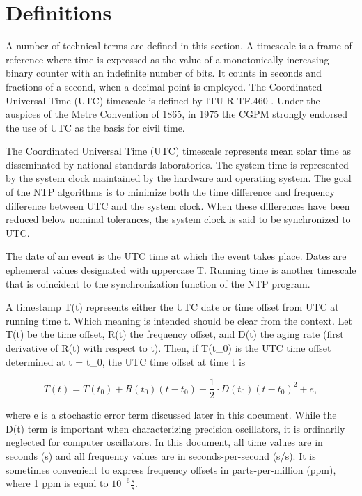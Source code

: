 \chapter{Definitions}

A number of technical terms are defined in this section. A timescale
is a frame of reference where time is expressed as the value of a
monotonically increasing binary counter with an indefinite number of
bits. It counts in seconds and fractions of a second, when a decimal
point is employed. The Coordinated Universal Time (UTC) timescale is
defined by ITU-R TF.460 \cite{ITU-R TF.460}. Under the auspices of the
Metre Convention of 1865, in 1975 the CGPM \cite{CGPM} strongly endorsed
the use of UTC as the basis for civil time.

The Coordinated Universal Time (UTC) timescale represents mean solar
time as disseminated by national standards laboratories. The system
time is represented by the system clock maintained by the hardware
and operating system. The goal of the NTP algorithms is to minimize
both the time difference and frequency difference between UTC and the
system clock. When these differences have been reduced below nominal
tolerances, the system clock is said to be synchronized to UTC.

The date of an event is the UTC time at which the event takes place.
Dates are ephemeral values designated with uppercase T. Running time
is another timescale that is coincident to the synchronization
function of the NTP program.

A timestamp T(t) represents either the UTC date or time offset from
UTC at running time t. Which meaning is intended should be clear
from the context. Let T(t) be the time offset, R(t) the frequency
offset, and D(t) the aging rate (first derivative of R(t) with
respect to t). Then, if T(t\_0) is the UTC time offset determined at
t = t\_0, the UTC time offset at time t is

$$
T(t) = T(t_0) + R(t_0)(t - t_0) + \frac{1}{2} \cdot D(t_0)(t - t_0)^2 + e,
$$

where e is a stochastic error term discussed later in this document.
While the D(t) term is important when characterizing precision
oscillators, it is ordinarily neglected for computer oscillators. In
this document, all time values are in seconds (s) and all frequency
values are in seconds-per-second (s/s). It is sometimes convenient
to express frequency offsets in parts-per-million (ppm), where 1 ppm
is equal to $ 10^{-6} \frac{s}{s} $.

